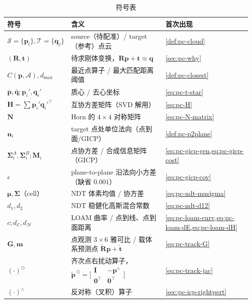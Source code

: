\begin{table}[H]\centering\small
\caption{符号表}
\begin{tabular}{lll}
\toprule
符号 & 含义 & 首次出现 \\
\midrule
$\mathcal{S}=\{\mathbf{p}_i\},\mathcal{T}=\{\mathbf{q}_j\}$ & source（待配准）/ target（参考）点云 & \cref{def:pc-cloud} \\
$(\mathbf{R},\mathbf{t})$ & 待求刚体变换，$\mathbf{R}\mathbf{p}+\mathbf{t}\approx\mathbf{q}$ & \cref{sec:pc-why} \\
$C(\mathbf{p},\mathcal{A}),d_{\max}$ & 最近点算子 / 最大匹配距离阈值 & \cref{def:pc-closest} \\
$\bar{\mathbf{p}},\bar{\mathbf{q}};\mathbf{p}_i',\mathbf{q}_i'$ & 质心 / 去心坐标 & \cref{eq:pc-t-star} \\
$\mathbf{H}=\sum\mathbf{p}_i'\mathbf{q}_i'^\top$ & 互协方差矩阵（SVD 解用） & \cref{eq:pc-H} \\
$\mathbf{N}$ & Horn 的 $4\times4$ 对称矩阵 & \cref{eq:pc-N-matrix} \\
$\mathbf{n}_i$ & target 点处单位法向（点到面/GICP） & \cref{def:pc-p2plane} \\
$\boldsymbol{\Sigma}_i^A,\boldsymbol{\Sigma}_i^B;\mathbf{M}_i$ & 点协方差 / 合成信息矩阵（GICP） & \cref{eq:pc-gicp-gen,eq:pc-gicp-cost} \\
$\epsilon$ & plane-to-plane 沿法向小方差（缺省 $0.001$） & \cref{eq:pc-gicp-cov} \\
$\boldsymbol{\mu},\boldsymbol{\Sigma}$（cell） & NDT 体素均值 / 协方差 & \cref{eq:pc-ndt-musigma} \\
$d_1,d_2$ & NDT 稳健化高斯混合常数 & \cref{eq:pc-ndt-d12} \\
$c;d_{\mathcal{E}},d_{\mathcal{H}}$ & LOAM 曲率 / 点到线、点到面距离 & \cref{eq:pc-loam-curv,eq:pc-loam-dE,eq:pc-loam-dH} \\
$\mathbf{G},\mathbf{m}$ & 点观测 $3\times6$ 雅可比 / 载体系预测点 $\check{\mathbf{R}}\mathbf{p}+\check{\mathbf{t}}$ & \cref{eq:pc-track-G} \\
$(\cdot)^{\odot}$ & 齐次点右扰动算子，$\tilde{\mathbf{p}}^{\,\odot}=\big[\begin{smallmatrix}\mathbf{I}&-\mathbf{p}^\wedge\\\mathbf{0}^\top&\mathbf{0}^\top\end{smallmatrix}\big]$ & \cref{eq:pc-track-jac} \\
$(\cdot)^\wedge$ & 反对称（叉积）算子 & \cref{sec:pc-icp-rightpert} \\
\bottomrule
\end{tabular}
\end{table}

